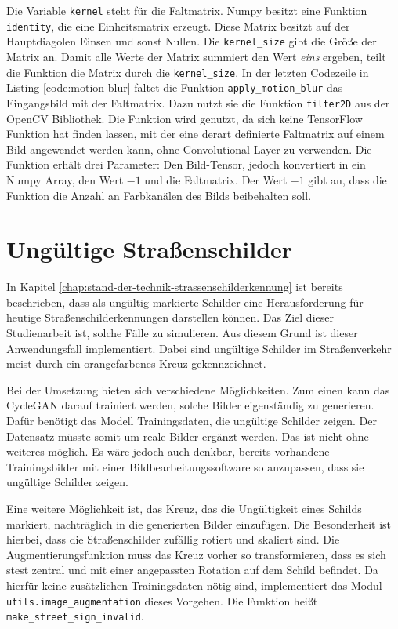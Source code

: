 Die Variable \texttt{kernel} steht für die Faltmatrix. Numpy besitzt eine Funktion \texttt{identity}, die eine Einheitsmatrix erzeugt. Diese Matrix besitzt auf der Hauptdiagolen Einsen und sonst Nullen. Die \texttt{kernel_size} gibt die Größe der Matrix an. Damit alle Werte der Matrix summiert den Wert \emph{eins} ergeben, teilt die Funktion die Matrix durch die \texttt{kernel_size}. In der letzten Codezeile in Listing \ref{code:motion-blur} faltet die Funktion \texttt{apply_motion_blur} das Eingangsbild mit der Faltmatrix. Dazu nutzt sie die Funktion \texttt{filter2D} aus der OpenCV Bibliothek. Die Funktion wird genutzt, da sich keine TensorFlow Funktion hat finden lassen, mit der eine derart definierte Faltmatrix auf einem Bild angewendet werden kann, ohne Convolutional Layer zu verwenden. Die Funktion erhält drei Parameter: Den Bild-Tensor, jedoch konvertiert in ein Numpy Array, den Wert $-1$ und die Faltmatrix. Der Wert $-1$ gibt an, dass die Funktion die Anzahl an Farbkanälen des Bilds beibehalten soll.


\section{Ungültige Straßenschilder}
In Kapitel \ref{chap:stand-der-technik-strassenschilderkennung} ist bereits beschrieben, dass als ungültig markierte Schilder eine Herausforderung für heutige Straßenschilderkennungen darstellen können. Das Ziel dieser Studienarbeit ist, solche Fälle zu simulieren. Aus diesem Grund ist dieser Anwendungsfall implementiert. Dabei sind ungültige Schilder im Straßenverkehr meist durch ein orangefarbenes Kreuz gekennzeichnet.

Bei der Umsetzung bieten sich verschiedene Möglichkeiten. Zum einen kann das \ac{CycleGAN} darauf trainiert werden, solche Bilder eigenständig zu generieren. Dafür benötigt das Modell Trainingsdaten, die ungültige Schilder zeigen. Der Datensatz müsste somit um reale Bilder ergänzt werden. Das ist nicht ohne weiteres möglich. Es wäre jedoch auch denkbar, bereits vorhandene Trainingsbilder mit einer Bildbearbeitungssoftware so anzupassen, dass sie ungültige Schilder zeigen.

Eine weitere Möglichkeit ist, das Kreuz, das die Ungültigkeit eines Schilds markiert, nachträglich in die generierten Bilder einzufügen. Die Besonderheit ist hierbei, dass die Straßenschilder zufällig rotiert und skaliert sind. Die Augmentierungsfunktion muss das Kreuz vorher so transformieren, dass es sich stest zentral und mit einer angepassten Rotation auf dem Schild befindet. Da hierfür keine zusätzlichen Trainingsdaten nötig sind, implementiert das Modul  \texttt{utils.image_augmentation} dieses Vorgehen. Die Funktion heißt \texttt{make_street_sign_invalid}. 

